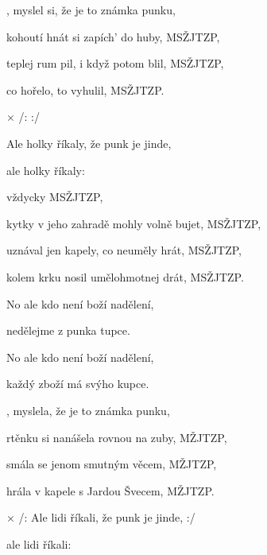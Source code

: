 

\zs
{}   , myslel si, že je to známka punku,

kohoutí hnát si zapích' do huby, MSŽJTZP,

teplej rum pil, i když potom blil, MSŽJTZP,

co hořelo, to vyhulil, MSŽJTZP.
\ks

× /:    :/   

Ale holky říkaly,
že punk je jinde,

ale holky říkaly:
\kr

\zs
{}   vždycky  MSŽJTZP,

kytky v jeho zahradě mohly volně bujet, MSŽJTZP,

uznával jen kapely, co neuměly hrát, MSŽJTZP,

kolem krku nosil umělohmotnej drát, MSŽJTZP.
\ks

\zr  \kr

\zs
{}   

No ale kdo není boží nadělení,

nedělejme z punka tupce.

No ale kdo není boží nadělení,

každý zboží má svýho kupce.
\ks

\zs
{}   ,
myslela, že je to známka punku,

rtěnku si nanášela rovnou na zuby, MŽJTZP,

smála se jenom smutným věcem, MŽJTZP,

hrála v kapele s Jardou Švecem, MŽJTZP.
\ks

× /: Ale lidi říkali,
že punk je jinde, :/

ale lidi říkali:
\kr

\kp






















